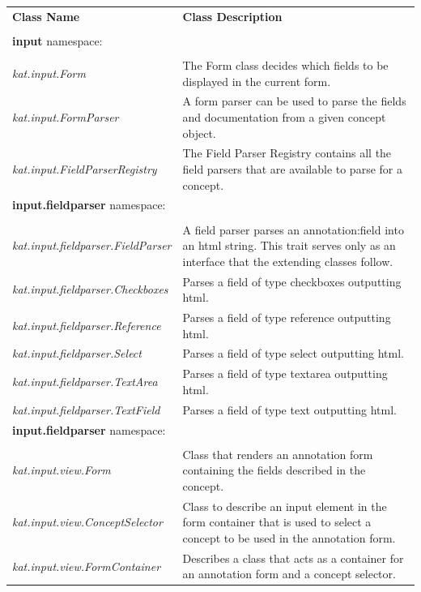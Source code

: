 \documentclass[a4paper, 12pt, notitlepage]{report}
\begin{document}
\newpage
\begin{tabular}{p{6cm} | p{8cm} }
 \large{\textbf{Class Name}} & \large{\textbf{Class Description}}\\ \\ \hline
 \textbf{input} namespace: \\\\ \hline
 \textit{kat.input.Form} & The Form class decides which fields to be displayed in the current form. \\ \hline
 \textit{kat.input.FormParser} & A form parser can be used to parse the fields and documentation from a given concept object.\\ \hline
 \textit{kat.input.FieldParserRegistry} & The Field Parser Registry contains all the field parsers that are available to parse for a concept.\\ \hline
 \textbf{input.fieldparser} namespace: \\\\ \hline
 \textit{kat.input.fieldparser.FieldParser} & A field parser parses an annotation:field into an html string. This trait serves only as an interface that the extending classes follow. \\ \hline
 \textit{kat.input.fieldparser.Checkboxes} & Parses a field of type checkboxes outputting html. \\ \hline
 \textit{kat.input.fieldparser.Reference} & Parses a field of type reference outputting html. \\ \hline
 \textit{kat.input.fieldparser.Select} & Parses a field of type select outputting html. \\ \hline
 \textit{kat.input.fieldparser.TextArea} & Parses a field of type textarea outputting html. \\ \hline
 \textit{kat.input.fieldparser.TextField} & Parses a field of type text outputting html. \\ \hline
 \textbf{input.fieldparser} namespace: \\\\ \hline
 \textit{kat.input.view.Form} & Class that renders an annotation form containing the fields described in the concept. \\ \hline
 \textit{kat.input.view.ConceptSelector} & Class to describe an input element in the form container that is used to select a concept to be used in the annotation form.\\ \hline
 \textit{kat.input.view.FormContainer} & Describes a class that acts as a container for an annotation form and a concept selector.\\ \hline

\end{tabular}
\end{document}

